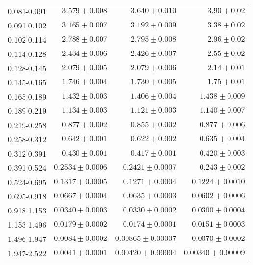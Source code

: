 \begin{table}
\begin{center}
\begin{tabular}{@{}l r r r@{}}
            0.081-0.091  &  $3.579   \pm  0.008$   &  $3.640    \pm  0.010$    &  $3.90     \pm  0.02$     \\
            0.091-0.102  &  $3.165   \pm  0.007$   &  $3.192    \pm  0.009$    &  $3.38     \pm  0.02$     \\
            0.102-0.114  &  $2.788   \pm  0.007$   &  $2.795    \pm  0.008$    &  $2.96     \pm  0.02$     \\
            0.114-0.128  &  $2.434   \pm  0.006$   &  $2.426    \pm  0.007$    &  $2.55     \pm  0.02$     \\
            0.128-0.145  &  $2.079   \pm  0.005$   &  $2.079    \pm  0.006$    &  $2.14     \pm  0.01$     \\
            0.145-0.165  &  $1.746   \pm  0.004$   &  $1.730    \pm  0.005$    &  $1.75     \pm  0.01$     \\
            0.165-0.189  &  $1.432   \pm  0.003$   &  $1.406    \pm  0.004$    &  $1.438    \pm  0.009$    \\
            0.189-0.219  &  $1.134   \pm  0.003$   &  $1.121    \pm  0.003$    &  $1.140    \pm  0.007$    \\
            0.219-0.258  &  $0.877   \pm  0.002$   &  $0.855    \pm  0.002$    &  $0.877    \pm  0.006$    \\
            0.258-0.312  &  $0.642   \pm  0.001$   &  $0.622    \pm  0.002$    &  $0.635    \pm  0.004$    \\
            0.312-0.391  &  $0.430   \pm  0.001$   &  $0.417    \pm  0.001$    &  $0.420    \pm  0.003$    \\
            0.391-0.524  &  $0.2534  \pm  0.0006$  &  $0.2421   \pm  0.0007$   &  $0.243    \pm  0.002$    \\
            0.524-0.695  &  $0.1317  \pm  0.0005$  &  $0.1271   \pm  0.0004$   &  $0.1224   \pm  0.0010$   \\
            0.695-0.918  &  $0.0667  \pm  0.0004$  &  $0.0635   \pm  0.0003$   &  $0.0602   \pm  0.0006$   \\
            0.918-1.153  &  $0.0340  \pm  0.0003$  &  $0.0330   \pm  0.0002$   &  $0.0300   \pm  0.0004$   \\
            1.153-1.496  &  $0.0179  \pm  0.0002$  &  $0.0174   \pm  0.0001$   &  $0.0151   \pm  0.0003$   \\
            1.496-1.947  &  $0.0084  \pm  0.0002$  &  $0.00865  \pm  0.00007$  &  $0.0070   \pm  0.0002$   \\
            1.947-2.522  &  $0.0041  \pm  0.0001$  &  $0.00420  \pm  0.00004$  &  $0.00340  \pm  0.00009$  \\

\end{tabular}
\end{center}
\end{table}
